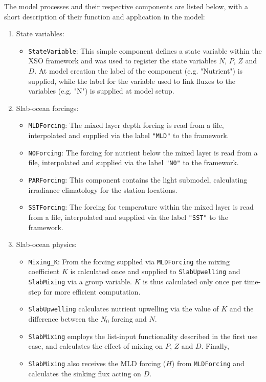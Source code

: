 \documentclass[journal abbreviation, manuscript]{copernicus}
\begin{document}
The model processes and their respective components are listed below, with a short description of their function and application in the model:

\begin{enumerate}
    \item State variables:
    \begin{itemize}
        \item \texttt{StateVariable}: This simple component defines a state variable within the XSO framework and was used to register the state variables $N$, $P$, $Z$ and $D$. At model creation the label of the component (e.g. "Nutrient") is supplied, while the label for the variable used to link fluxes to the variables (e.g. "N") is supplied at model setup.
    \end{itemize}
    
    \item Slab-ocean forcings:
    \begin{itemize}
        \item \texttt{MLDForcing}: The mixed layer depth forcing is read from a file, interpolated and supplied via the label \texttt{"MLD"} to the framework. 
        \item \texttt{N0Forcing}: The forcing for nutrient below the mixed layer is read from a file, interpolated and supplied via the label \texttt{"N0"} to the framework. 
        \item \texttt{PARForcing}: This component contains the light submodel, calculating irradiance climatology for the station locations.
        \item \texttt{SSTForcing}: The forcing for temperature within the mixed layer is read from a file, interpolated and supplied via the label \texttt{"SST"} to the framework.
    \end{itemize}
    
    \item Slab-ocean physics:
    \begin{itemize}
        \item \texttt{Mixing\_K}: From the forcing supplied via \texttt{MLDForcing} the mixing coefficient $K$ is calculated once and supplied to \texttt{SlabUpwelling} and \texttt{SlabMixing} via a group variable. $K$ is thus calculated only once per time-step for more efficient computation.
        \item \texttt{SlabUpwelling} calculates nutrient upwelling via the value of $K$ and the difference between the $N_0$ forcing and $N$. 
        \item \texttt{SlabMixing} employs the list-input functionality described in the first use case, and calculates the effect of mixing on $P$, $Z$ and $D$. Finally, 
        \item \texttt{SlabMixing} also receives the MLD forcing ($H$) from \texttt{MLDForcing} and calculates the sinking flux acting on $D$.
    \end{itemize}
    

\end{enumerate}
\end{document}
